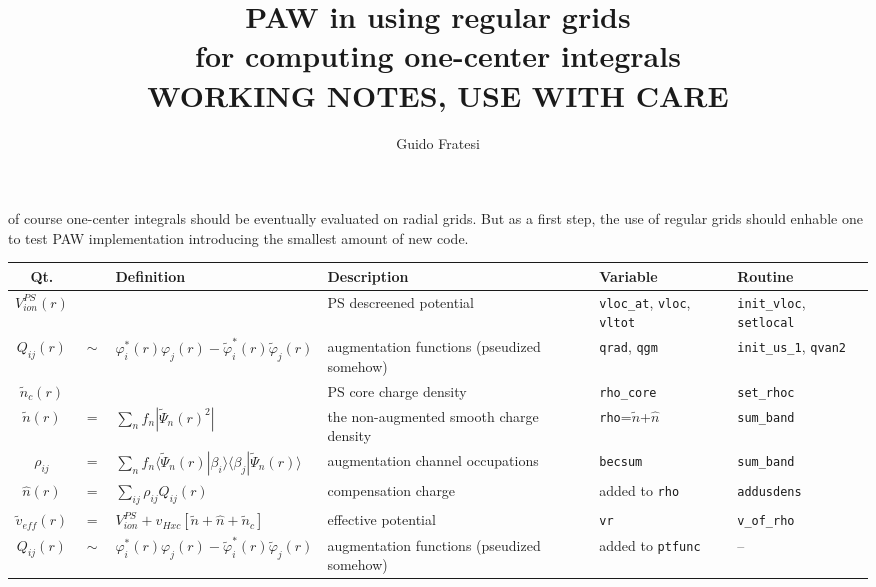 \documentclass[a4paper,twocolumn,12pt]{article}
\title{PAW in \var{pw.x} using regular grids\\for computing one-center
integrals\\WORKING NOTES, USE WITH CARE}
\author{Guido Fratesi}
\newcommand{\var}[1]{{\tt #1}}
\renewcommand{\phi}{\varphi}
\begin{document}
\maketitle


 of course one-center integrals should be
eventually evaluated on radial grids.  But as a first step, the use of
regular grids should enhable one to test PAW implementation
introducing the smallest amount of new code.

\begin{table*}
\hspace{-1.2cm}
\begin{small}
\begin{tabular}{|c@{}c@{}l|p{4.5cm}|p{4.5cm}|p{4.0cm}|}
\hline
Qt. & & Definition & Description & Variable & Routine \\
\hline
%
%
\hline $V^{PS}_{ion}(r)$ &&& PS descreened potential & \var{vloc\_at}, \var{vloc}, \var{vltot} & \var{init\_vloc}, \var{setlocal} \\
%
$Q_{ij}(r)$ &$\sim$& $\phi^*_i(r)\phi_j(r)-\tilde{\phi}^*_i(r)\tilde{\phi}_j(r)$ & augmentation functions (pseudized somehow) & \var{qrad}, \var{qgm} & \var{init\_us\_1}, \var{qvan2} \\
%
$\tilde{n}_c(r)$ && & PS core charge density & \var{rho\_core} & \var{set\_rhoc}\\
%
\hline
%
$\tilde{n}(r)$ &$=$& $\sum_n f_n |\tilde{\Psi}_n(r)^2|$ &the
non-augmented smooth charge density&\var{rho}=$\tilde{n}$+$\hat{n}$&\var{sum\_band}\\
%
$\rho_{ij}$ &$=$& $\sum_n f_n
\langle\tilde{\Psi}_n(r)|\beta_i\rangle\langle\beta_j|\tilde{\Psi}_n(r)\rangle$
& augmentation channel occupations & \var{becsum} &\var{sum\_band} \\
%
$\hat{n}(r)$ &$=$& $\sum_{ij}\rho_{ij}Q_{ij}(r)$ & compensation
charge & added to \var{rho} & \var{addusdens} \\
%
$\tilde{v}_{eff}(r)$ &$=$& $V^{PS}_{ion}+v_{Hxc}[\tilde{n}+\hat{n}+\tilde{n}_c]$ & effective potential &\var{vr} & \var{v\_of\_rho} \\
%
\hline
%
\hline $Q_{ij}(r)$ &$\sim$& $\phi^*_i(r)\phi_j(r)-\tilde{\phi}^*_i(r)\tilde{\phi}_j(r)$ & augmentation functions (pseudized somehow) & added to \var{ptfunc} & --\\

\end{tabular}
\end{small}
\end{table*}
\end{document}
